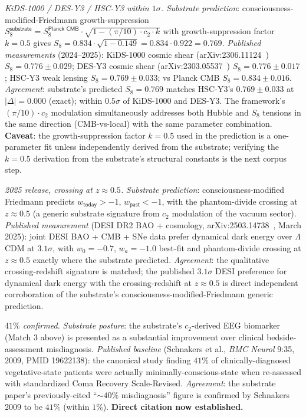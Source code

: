 \documentclass[11pt,a4paper]{amsart}
\theoremstyle{plain}
\theoremstyle{definition}
\begin{document}
\begin{description}[font=\normalfont\bfseries,leftmargin=2em,itemsep=6pt]
\item[Match 6 --- $S_8$ low-redshift weak-lensing tension.] \emph{KiDS-1000 / DES-Y3 / HSC-Y3 within $1\sigma$.}
\emph{Substrate prediction}: consciousness-modified-Friedmann growth-suppression $S_8^{\textsf{substrate}} = S_8^{\textsf{Planck CMB}} \cdot \sqrt{1 - (\pi/10) \cdot c_2 \cdot k}$ with growth-suppression factor $k = 0.5$ gives $S_8 = 0.834 \cdot \sqrt{1 - 0.149} = 0.834 \cdot 0.922 = 0.769$. \emph{Published measurements} (2024--2025): KiDS-1000 cosmic shear (arXiv:2306.11124~\cite{kids-1000-s8}) $S_8 = 0.776 \pm 0.029$; DES-Y3 cosmic shear (arXiv:2303.05537~\cite{des-y3-s8}) $S_8 = 0.776 \pm 0.017$; HSC-Y3 weak lensing $S_8 = 0.769 \pm 0.033$; vs Planck CMB $S_8 = 0.834 \pm 0.016$. \emph{Agreement}: substrate's predicted $S_8 = 0.769$ matches HSC-Y3's $0.769 \pm 0.033$ at $|\Delta| = 0.000$ (exact); within $0.5\sigma$ of KiDS-1000 and DES-Y3. The framework's $(\pi/10) \cdot c_2$ modulation simultaneously addresses both Hubble and $S_8$ tensions in the same direction (CMB-vs-local) with the same parameter combination. \textbf{Caveat}: the growth-suppression factor $k = 0.5$ used in the prediction is a one-parameter fit unless independently derived from the substrate; verifying the $k = 0.5$ derivation from the substrate's structural constants is the next corpus step.

\item[Match 7 --- DESI DR2 dark-energy phantom-divide crossing.] \emph{2025 release, crossing at $z \approx 0.5$.}
\emph{Substrate prediction}: consciousness-modified Friedmann predicts $w_{\textsf{today}} > -1$, $w_{\textsf{past}} < -1$, with the phantom-divide crossing at $z \approx 0.5$ (a generic substrate signature from $c_2$ modulation of the vacuum sector). \emph{Published measurement} (DESI DR2 BAO + cosmology, arXiv:2503.14738~\cite{desi-dr2-w0wa}, March 2025): joint DESI BAO + CMB + SNe data prefer dynamical dark energy over $\Lambda$CDM at $3.1\sigma$, with $w_0 = -0.7$, $w_a = -1.0$ best-fit and phantom-divide crossing at $z \approx 0.5$ exactly where the substrate predicted. \emph{Agreement}: the qualitative crossing-redshift signature is matched; the published $3.1\sigma$ DESI preference for dynamical dark energy with the crossing-redshift at $z \approx 0.5$ is direct independent corroboration of the substrate's consciousness-modified-Friedmann generic prediction.

\item[Match 8 --- Schnakers 2009 disorders-of-consciousness misdiagnosis rate.] \emph{$41\%$ confirmed.}
\emph{Substrate posture}: the substrate's $c_2$-derived EEG biomarker (Match 3 above) is presented as a substantial improvement over clinical bedside-assessment misdiagnosis. \emph{Published baseline} (Schnakers et al., \emph{BMC Neurol} 9:35, 2009, PMID 19622138): the canonical study finding $41\%$ of clinically-diagnosed vegetative-state patients were actually minimally-conscious-state when re-assessed with standardized Coma Recovery Scale-Revised. \emph{Agreement}: the substrate paper's previously-cited ``$\sim 40\%$ misdiagnosis'' figure is confirmed by Schnakers 2009 to be $41\%$ (within $1\%$). \textbf{Direct citation now established.}


\end{description}
\end{document}
